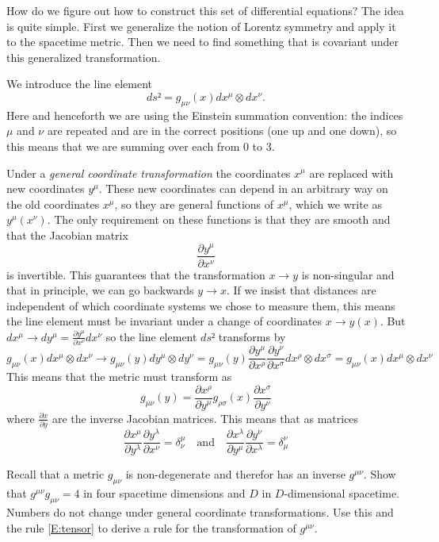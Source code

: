 How do we figure out how to construct this set of differential equations? The idea is quite simple. First we generalize the notion of Lorentz symmetry and apply it to the spacetime metric. Then we need to find something that is covariant under this generalized transformation. 

We introduce the line element 
$$
ds² = g_{μ ν}(x) dx^μ ⊗ dx^ν. 
$$
Here and henceforth we are using the Einstein summation convention: the indices $μ$ and $ν$ are repeated and are in the correct positions (one up and one down), so this means that we are summing over each from 0 to 3.

Under a {\em general coordinate transformation} the coordinates $x^μ$ are replaced with new coordinates $y^μ$. These new coordinates can depend in an arbitrary way on the old coordinates $x^μ$, so they are general functions of $x^μ$, which we write as $y^μ(x^ν)$. The only requirement on these functions is that they are smooth and that the Jacobian matrix 
$$
\frac {∂y^μ}{∂x^ν}
$$
is invertible. This guarantees that the transformation $x→y$ is non-singular and that in principle, we can go backwards $y→x$. If we insist that distances are independent of which coordinate systems we chose to measure them, this means the line element must be invariant under a change of coordinates $x→y(x)$. But $dx^μ → dy^μ = \frac {∂y^μ}{∂x^ν} dx^ν$ so the line element $ds²$ transforms by
$$
g_{μ ν}(x) dx^μ ⊗ dx^ν → g_{μ ν}(y) dy^μ ⊗ dy^ν= g_{μ ν}(y) \frac {∂y^μ}{∂x^ρ} \frac {∂y^ν}{∂x^σ}dx^ρ⊗dx^σ =g_{μ ν}(x) dx^μ ⊗ dx^ν
$$
This means that the metric must transform as 
\begin{equation}\label{E:tensor}
g_{μ ν}(y) =\frac {∂x^ρ}{∂y^μ} g_{ρ σ}(x)  \frac {∂x^σ}{∂y^ν}
\end{equation}
where $\frac {∂x}{∂y}$ are the inverse Jacobian matrices. This means that as matrices
\begin{equation}\label{E:JacInv}
\frac {∂x^μ}{∂y^λ} \frac {∂y^λ}{∂x^ν}  = δ_ν^μ 
\quad \textrm{and}\quad
\frac {∂x^λ}{∂y^μ} \frac {∂y^ν}{∂x^λ} =  δ^ν_μ 
\end{equation}
\begin{exercise}
Recall that a metric $g_{μ ν}$ is non-degenerate and therefor has an inverse $g^{μ ν}$. Show that $g^{μ ν}g_{μ ν}=4$ in four spacetime dimensions and $D$ in $D$-dimensional spacetime. Numbers do not change under general coordinate transformations. Use this and the rule \eqref{E:tensor} to derive a rule for the transformation of $g^{μ ν}$.
\end{exercise}

